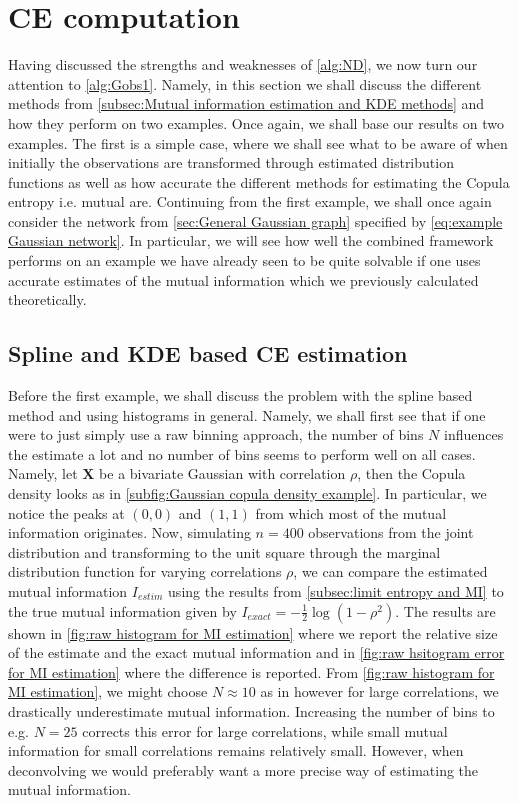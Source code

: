 \documentclass[../Thesis.tex]{subfiles}
\begin{document}
\section{CE computation}\label{sec:gaussian MI error}
Having discussed the strengths and weaknesses of \autoref{alg:ND}, we now turn our attention to \autoref{alg:Gobs1}. Namely, in this section we shall discuss the different methods from \autoref{subsec:Mutual information estimation and KDE methods} and how they perform on two examples. Once again, we shall base our results on two examples. The first is a simple case, where we shall see what to be aware of when initially the observations are transformed through estimated distribution functions as well as how accurate the different methods for estimating the Copula entropy i.e. mutual are. Continuing from the first example, we shall once again consider the network from \autoref{sec:General Gaussian graph} specified by \autoref{eq:example Gaussian network}. In particular, we will see how well the combined framework performs on an example we have already seen to be quite solvable if one uses accurate estimates of the mutual information which we previously calculated theoretically.



\subsection{Spline and KDE based CE estimation}\label{subsec:Spline and KDE based CE estimation}
Before the first example, we shall discuss the problem with the spline based method and using histograms in general. Namely, we shall first see that if one were to just simply use a raw binning approach, the number of bins $N$ influences the estimate a lot and no number of bins seems to perform well on all cases. Namely, let $\boldsymbol X$ be a bivariate Gaussian with correlation $\rho$, then the Copula density looks as in \autoref{subfig:Gaussian copula density example}. In particular, we notice the peaks at $(0,0)$ and $(1,1)$ from which most of the mutual information originates. Now, simulating $n = 400$ observations from the joint distribution and transforming to the unit square through the marginal distribution function for varying correlations $\rho$, we can compare the estimated mutual information $I_{estim}$ using the results from \autoref{subsec:limit entropy and MI} to the true mutual information given by $ I_{exact} = - \frac{1}{2} \log \left(1 - \rho^2\right)$. The results are shown in \autoref{fig:raw histogram for MI estimation} where we report the relative size of the estimate and the exact mutual information and in \autoref{fig:raw hsitogram error for MI estimation} where the difference is reported. From \autoref{fig:raw histogram for MI estimation}, we might choose $N \approx 10$ as in \cite{Network-deconvolution-as-a-general-method-to-distinguish-direct-dependencies-in-networks} however for large correlations, we drastically underestimate mutual information. Increasing the number of bins to e.g. $N = 25$ corrects this error for large correlations, while small mutual information for small correlations remains relatively small. However, when deconvolving we would preferably want a more precise way of estimating the mutual information.
\end{document}
